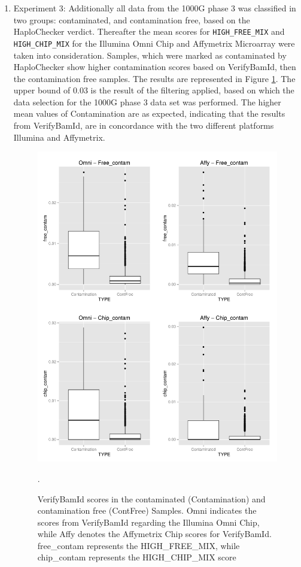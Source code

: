 \begin{enumerate}
\item Experiment 3: Additionally all data from the 1000G phase 3 was classified in two groups: contaminated, and contamination free, based on the HaploChecker verdict. Thereafter the mean scores for  \verb|HIGH_FREE_MIX| and \verb|HIGH_CHIP_MIX| for the Illumina Omni Chip and Affymetrix Microarray were taken into consideration. Samples, which were marked as contaminated by HaploChecker show higher contamination scores based on VerifyBamId, then the contamination free samples. The results are represented in Figure \ref{contScores}. The upper bound of 0.03 is the result of the filtering applied, based on which the data selection for the 1000G phase 3 data set was performed. The higher mean values of Contamination are as expected, indicating that the results from VerifyBamId, are in concordance with the two different platforms Illumina and Affymetrix.
\begin{figure}[!ht]
    \centering
    \includegraphics[width=1\textwidth]{images/Result-VerifyBamId-check.pdf}
    \caption[VerifyBamId scores in the contaminated (Contamination) and contamination free (ContFree) Samples]{VerifyBamId scores in the contaminated (Contamination) and contamination free (ContFree) Samples. Omni indicates the scores from VerifyBamId regarding the Illumina Omni Chip, while Affy denotes the Affymetrix Chip scores for VerifyBamId. free\_contam represents the HIGH\_FREE\_MIX, while chip\_contam represents the HIGH\_CHIP\_MIX score}.  
    \label{contScores}
\end{figure}
\end{enumerate}

